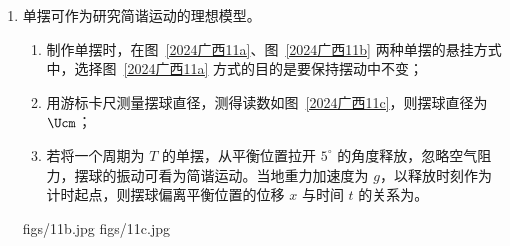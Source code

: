 \documentclass[\gkver]{gaokaozhenti}
\begin{document}
\begin{enumerate}
{B．锤子撞击木栓后木栓获得的动能为

$E_{k} = \frac{1}{2}mv^{2} = \frac{I^{2}}{2m}$

木栓进入过程根据动能定理有

$(mg - \overline{f})\Delta x = 0 - E_{k}$

解得平均阻力为 $f = \frac{I^{2}}{2m\Delta x} + mg$

故 B 正确；

C．木栓进入过程损失的动能与重力势能，一部分转化为系统内能，另一部分转化为木栓的弹性势能，

$\frac{I^{2}}{2m} + mg\Delta x > Q = E_{\text{损}}$

故 C 错误；

D．对木栓的一个侧面受力分析如图。


由于方孔侧壁弹力成线性变化，则有

$\frac{1}{2}(f\sin\theta + F_{N}\cos\theta) = \frac{1}{4}\overline{f}$

且根据 B 选项求得平均阻力 $f = \frac{I^{2}}{2m\Delta x} + mg$

又因为 $f = \mu F_{N}$

联立可得 $f = \frac{\mu(I^{2} + 2m^{2}g\Delta x)}{4m\Delta x(\cos\theta + \mu\sin\theta)}$

故 D 正确。

故选 BD。
}

\item
单摆可作为研究简谐运动的理想模型。
\begin{enumerate}
	\item
	制作单摆时，在图~\ref{2024广西11a}、图~\ref{2024广西11b} 两种单摆的悬挂方式中，选择图~\ref{2024广西11a} 方式的目的是要保持摆动中不变；
	\item
	用游标卡尺测量摆球直径，测得读数如图~\ref{2024广西11c}，则摆球直径为$\Ucm$；
	\item
	若将一个周期为 $T$ 的单摆，从平衡位置拉开 $5^{\circ}$ 的角度释放，忽略空气阻力，摆球的振动可看为简谐运动。当地重力加速度为 $g$，以释放时刻作为计时起点，则摆球偏离平衡位置的位移 $x$ 与时间 $t$ 的关系为。
\end{enumerate}
{figs/11b.jpg}
{figs/11c.jpg}


\end{enumerate}
\end{document}
